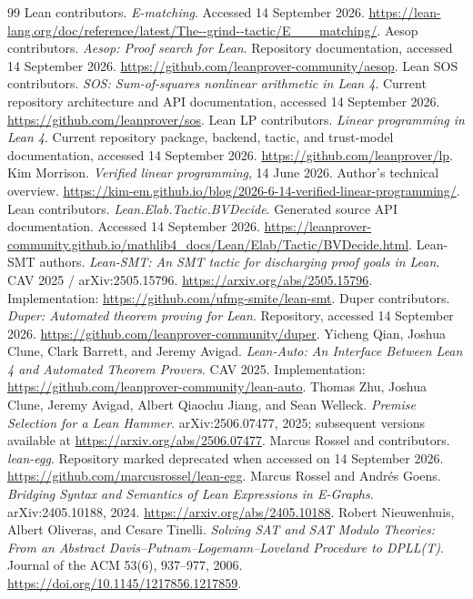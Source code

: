 \documentclass[11pt,letterpaper]{article}
\theoremstyle{definition}\newtheorem{definition}[proposition]{Definition}
\begin{document}
\begin{thebibliography}{99}
 Lean contributors. \emph{E-matching}. Accessed 14 September 2026. \url{https://lean-lang.org/doc/reference/latest/The--grind--tactic/E___matching/}.
 Aesop contributors. \emph{Aesop: Proof search for Lean}. Repository documentation, accessed 14 September 2026. \url{https://github.com/leanprover-community/aesop}.
 Lean SOS contributors. \emph{SOS: Sum-of-squares nonlinear arithmetic in Lean 4}. Current repository architecture and API documentation, accessed 14 September 2026. \url{https://github.com/leanprover/sos}.
 Lean LP contributors. \emph{Linear programming in Lean 4}. Current repository package, backend, tactic, and trust-model documentation, accessed 14 September 2026. \url{https://github.com/leanprover/lp}.
 Kim Morrison. \emph{Verified linear programming}, 14 June 2026. Author's technical overview. \url{https://kim-em.github.io/blog/2026-6-14-verified-linear-programming/}.
 Lean contributors. \emph{Lean.Elab.Tactic.BVDecide}. Generated source API documentation. Accessed 14 September 2026. \url{https://leanprover-community.github.io/mathlib4_docs/Lean/Elab/Tactic/BVDecide.html}.
 Lean-SMT authors. \emph{Lean-SMT: An SMT tactic for discharging proof goals in Lean}. CAV 2025 / arXiv:2505.15796. \url{https://arxiv.org/abs/2505.15796}. Implementation: \url{https://github.com/ufmg-smite/lean-smt}.
 Duper contributors. \emph{Duper: Automated theorem proving for Lean}. Repository, accessed 14 September 2026. \url{https://github.com/leanprover-community/duper}.
 Yicheng Qian, Joshua Clune, Clark Barrett, and Jeremy Avigad. \emph{Lean-Auto: An Interface Between Lean 4 and Automated Theorem Provers}. CAV 2025. Implementation: \url{https://github.com/leanprover-community/lean-auto}.
 Thomas Zhu, Joshua Clune, Jeremy Avigad, Albert Qiaochu Jiang, and Sean Welleck. \emph{Premise Selection for a Lean Hammer}. arXiv:2506.07477, 2025; subsequent versions available at \url{https://arxiv.org/abs/2506.07477}.
 Marcus Rossel and contributors. \emph{lean-egg}. Repository marked deprecated when accessed on 14 September 2026. \url{https://github.com/marcusrossel/lean-egg}.
 Marcus Rossel and Andr\'es Goens. \emph{Bridging Syntax and Semantics of Lean Expressions in E-Graphs}. arXiv:2405.10188, 2024. \url{https://arxiv.org/abs/2405.10188}.
 Robert Nieuwenhuis, Albert Oliveras, and Cesare Tinelli. \emph{Solving SAT and SAT Modulo Theories: From an Abstract Davis--Putnam--Logemann--Loveland Procedure to DPLL(T)}. Journal of the ACM 53(6), 937--977, 2006. \url{https://doi.org/10.1145/1217856.1217859}.

\end{thebibliography}
\end{document}
